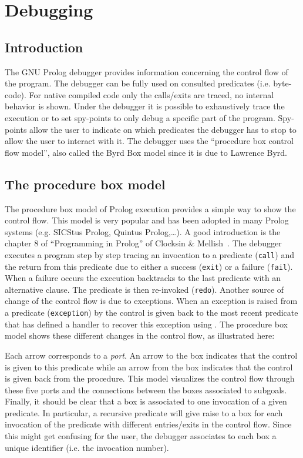 \newpage
\section{Debugging}
\label{Debugging}
\subsection{Introduction}
The GNU Prolog debugger provides information concerning the control flow of
the program. The debugger can be fully used on consulted predicates (i.e.
byte-code). For native compiled code only the calls/exits are traced, no
internal behavior is shown. Under the debugger it is possible to exhaustively
trace the execution or to set spy-points to only debug a specific part of the
program. Spy-points allow the user to indicate on which predicates the
debugger has to stop to allow the user to interact with it. The debugger uses
the ``procedure box control flow model'', also called the Byrd Box model
since it is due to Lawrence Byrd.

\subsection{The procedure box model}
The procedure box model of Prolog execution provides a simple way to show
the control flow. This model is very popular and has been adopted in many
Prolog systems (e.g. SICStus Prolog, Quintus Prolog,\ldots). A good
introduction is the chapter 8 of ``Programming in Prolog'' of Clocksin \&
Mellish~\cite{Clock}. The debugger executes a program step by step tracing an
invocation to a predicate (\texttt{call}) and the return from this predicate
due to either a success (\texttt{exit}) or a failure (\texttt{fail}). When a
failure occurs the execution backtracks to the last predicate with an
alternative clause. The predicate is then re-invoked (\texttt{redo}).
Another source of change of the control flow is due to exceptions. When an
exception is raised from a predicate (\texttt{exception}) by
  the control is given back to the most
recent predicate that has defined a handler to recover this exception using
 . The procedure box model shows these
different changes in the control flow, as illustrated here:


Each arrow corresponds to a \emph{port}. An arrow to the box indicates
that the control is given to this predicate while an arrow from the box
indicates that the control is given back from the procedure. This model
visualizes the control flow through these five ports and the connections
between the boxes associated to subgoals. Finally, it should be clear that a
box is associated to one invocation of a given predicate. In particular, a
recursive predicate will give raise to a box for each invocation of the
predicate with different entries/exits in the control flow. Since this might
get confusing for the user, the debugger associates to each box a unique
identifier (i.e. the invocation number). 

